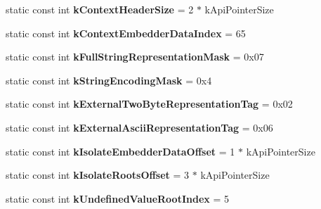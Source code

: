 \begin{DoxyCompactItemize}
\item 
\hypertarget{classv8_1_1internal_1_1_internals_aa5187d7653158ef851c53594e6e63851}{}static const int {\bfseries k\+Context\+Header\+Size} = 2 $\ast$ k\+Api\+Pointer\+Size\label{classv8_1_1internal_1_1_internals_aa5187d7653158ef851c53594e6e63851}

\item 
\hypertarget{classv8_1_1internal_1_1_internals_afb65846499ec5f68172e4b2e8301a493}{}static const int {\bfseries k\+Context\+Embedder\+Data\+Index} = 65\label{classv8_1_1internal_1_1_internals_afb65846499ec5f68172e4b2e8301a493}

\item 
\hypertarget{classv8_1_1internal_1_1_internals_a5c39a86b30463928ea719def66916507}{}static const int {\bfseries k\+Full\+String\+Representation\+Mask} = 0x07\label{classv8_1_1internal_1_1_internals_a5c39a86b30463928ea719def66916507}

\item 
\hypertarget{classv8_1_1internal_1_1_internals_a1927ac3def13a57e03025e62ca46d1c5}{}static const int {\bfseries k\+String\+Encoding\+Mask} = 0x4\label{classv8_1_1internal_1_1_internals_a1927ac3def13a57e03025e62ca46d1c5}

\item 
\hypertarget{classv8_1_1internal_1_1_internals_a73faf917416d2519b65c7255e77a74ce}{}static const int {\bfseries k\+External\+Two\+Byte\+Representation\+Tag} = 0x02\label{classv8_1_1internal_1_1_internals_a73faf917416d2519b65c7255e77a74ce}

\item 
\hypertarget{classv8_1_1internal_1_1_internals_adea2f5a76d07821f7fa885a8dcda0eec}{}static const int {\bfseries k\+External\+Ascii\+Representation\+Tag} = 0x06\label{classv8_1_1internal_1_1_internals_adea2f5a76d07821f7fa885a8dcda0eec}

\item 
\hypertarget{classv8_1_1internal_1_1_internals_ad722bf4760df09958cd1062db4a5524c}{}static const int {\bfseries k\+Isolate\+Embedder\+Data\+Offset} = 1 $\ast$ k\+Api\+Pointer\+Size\label{classv8_1_1internal_1_1_internals_ad722bf4760df09958cd1062db4a5524c}

\item 
\hypertarget{classv8_1_1internal_1_1_internals_a3142f942a25203ce7fca0e9a4563c74d}{}static const int {\bfseries k\+Isolate\+Roots\+Offset} = 3 $\ast$ k\+Api\+Pointer\+Size\label{classv8_1_1internal_1_1_internals_a3142f942a25203ce7fca0e9a4563c74d}

\item 
\hypertarget{classv8_1_1internal_1_1_internals_a7281ff0eafed559e64613465b1a03296}{}static const int {\bfseries k\+Undefined\+Value\+Root\+Index} = 5\label{classv8_1_1internal_1_1_internals_a7281ff0eafed559e64613465b1a03296}


\end{DoxyCompactItemize}
